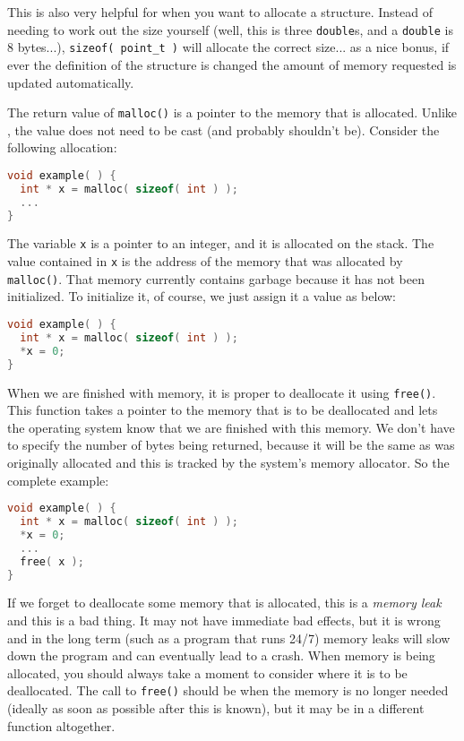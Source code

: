 This is also very helpful for when you want to allocate a structure. Instead of needing to work out the size yourself (well, this is three \texttt{double}s, and a \texttt{double} is 8 bytes...), \texttt{sizeof( point\_t )} will allocate the correct size... as a nice bonus, if ever the definition of the structure is changed the amount of memory requested is updated automatically.

The return value of \texttt{malloc()} is a pointer to the memory that is allocated. Unlike \Cpp, the value does not need to be cast (and probably shouldn't be).
Consider the following allocation:

\begin{lstlisting}[language=C]
void example( ) {
  int * x = malloc( sizeof( int ) );
  ...
}
\end{lstlisting}

The variable \texttt{x} is a pointer to an integer, and it is allocated on the stack. The value contained in \texttt{x} is the address of the memory that was allocated by \texttt{malloc()}. That memory currently contains garbage because it has not been initialized. To initialize it, of course, we just assign it a value as below:

\begin{lstlisting}[language=C]
void example( ) {
  int * x = malloc( sizeof( int ) );
  *x = 0;
}
\end{lstlisting}

When we are finished with memory, it is proper to deallocate it using \texttt{free()}. This function takes a pointer to the memory that is to be deallocated and lets the operating system know that we are finished with this memory. We don't have to specify the number of bytes being returned, because it will be the same as was originally allocated and this is tracked by the system's memory allocator. So the complete example:

\begin{lstlisting}[language=C]
void example( ) {
  int * x = malloc( sizeof( int ) );
  *x = 0;
  ...
  free( x );
}
\end{lstlisting}

If we forget to deallocate some memory that is allocated, this is a \textit{memory leak} and this is a bad thing. It may not have immediate bad effects, but it is wrong and in the long term (such as a program that runs 24/7) memory leaks will slow down the program and can eventually lead to a crash. When memory is being allocated, you should always take a moment to consider where it is to be deallocated. The call to \texttt{free()} should be when the memory is no longer needed (ideally as soon as possible after this is known), but it may be in a different function altogether.

